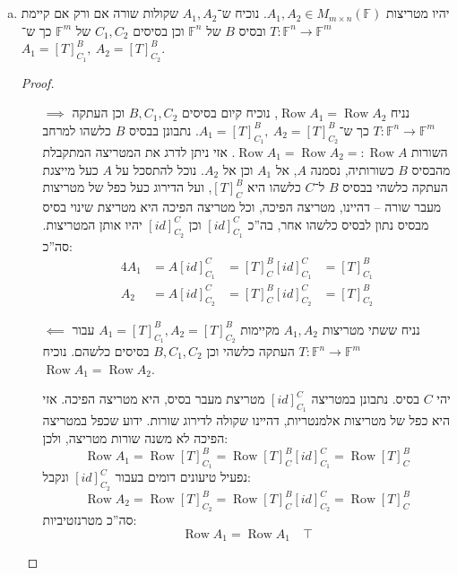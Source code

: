 \documentclass[]{article}
\DeclareMathOperator{\row}    {Row}
\newcommand\F         {\mathbb{F}}
\newcommand\co        {\colon}
\theoremstyle{definition}
\begin{document}
    
    \section{}
    \begin{enumerate}[(a)]
        \item יהיו מטריצות $A_1, A_2 \in M_{m \times n}(\F)$. נוכיח ש־$A_1, A_2$ שקולות שורה אם ורק אם קיימת $T \co \F^n \to \F^m$ ובסיס $B$ של $\F^n$ וכן בסיסים $C_1, C_2$ של $\F^m$ כך ש־$A_1 = [T]^B_{C_1}, \ A_2 = [T]^B_{C_2}$. 
        
        \begin{proof}\,
            \begin{enumerate} 
                \item[$\implies$]נניח $\row A_1 = \row A_2$, נוכיח קיום בסיסים $B, C_1, C_2$ וכן העתקה $T \co \F^{n} \to \F^{m}$ כך ש־$A_1 = [T]^{B}_{C_1}, \ A_2 = [T]^{B}_{C_2}$. נתבונן בבסיס $B$ כלשהו למרחב השורות $\row A_1 = \row A_2 =: \row A$. אזי ניתן לדרג את המטריצה המתקבלת מהבסיס $B$ כשורותיה, נסמנה $A$, אל $A_1$ וכן אל $A_2$. נוכל להתסכל על $A$ כעל מייצגת העתקה כלשהי בבסיס $B$ ל־$C$ כלשהו היא $[T]^{B}_C$, ועל הדירוג כעל כפל של מטריצות מעבר שורה -- דהיינו, מטריצה הפיכה, וכל מטריצה הפיכה היא מטריצת שינוי בסיס מבסיס נתון לבסיס כלשהו אחר, בה''כ $[id]^{C}_{C_1}$ וכן $[id]^{C}_{C_2}$ יהיו אותן המטריצות. סה''כ: 
                \begin{alignat*}{4}
                    A_1 & = A[id]^{C}_{C_1} &= [T]^{B}_{C}[id]^{C}_{C_1} &= [T]^{B}_{C_1} \\
                    A_2 & = A[id]^{C}_{C_2} &= [T]^{B}_{C}[id]^{C}_{C_2} &= [T]^{B}_{C_2}
                \end{alignat*}
                \item[$\impliedby$]נניח ששתי מטריצות $A_1, A_2$ מקיימות $A_1 = [T]^{B}_{C_1}, A_2 = [T]^{B}_{C_2}$ עבור $T \co \F^{n} \to \F^{m}$ העתקה כלשהי וכן $B, C_1, C_2$ בסיסים כלשהם. נוכיח $\row A_1 = \row A_2$. 
                
                יהי $C$ בסיס. נתבונן במטריצה $[id]^{C}_{C_1}$ מטריצת מעבר בסיס, היא מטריצה הפיכה. אזי היא כפל של מטריצות אלמנטריות, דהיינו שקולה לדירוג שורות. ידוע שכפל במטריצה הפיכה לא משנה שורות מטריצה, ולכן: 
                \[ \row A_1 = \row [T]^{B}_{C_1} = \row [T]^{B}_C[id]^{C}_{C_1} = \row [T]^{B}_C \]
                נפעיל טיעונים דומים בעבור $[id]^{C}_{C_2}$ ונקבל: 
                \[ \row A_2 = \row [T]^{B}_{C_2} = \row [T]^{B}_C[id]^{C}_{C_2} = \row [T]^{B}_C \]
                סה''כ מטרנזטיביות: 
                \[ \row A_1 = \row A_1 \quad \top \]
                

\end{enumerate}
\end{proof}
\end{enumerate}
\end{document}
